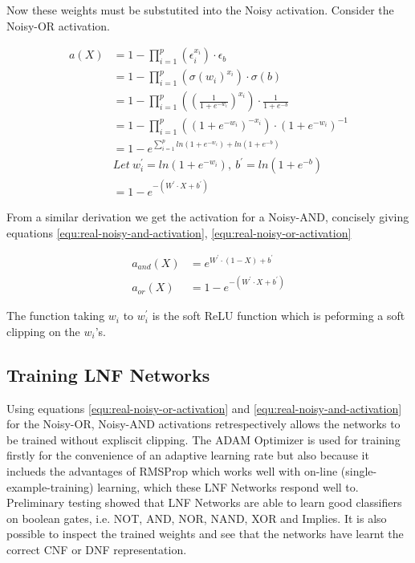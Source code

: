 Now these weights must be substutited into the Noisy activation. Consider the Noisy-OR activation.

\begin{align*}
a(X) &= 1 - \prod^p_{i=1}(\epsilon_i^{x_i}) \cdot \epsilon_b\\
&= 1 - \prod^p_{i=1}(\sigma(w_i)^{x_i}) \cdot \sigma(b)\\
&= 1 - \prod^p_{i=1}((\frac{1}{1 + e^{-w_i}})^{x_i}) \cdot \frac{1}{1 + e^{-b}}\\
&= 1 - \prod^p_{i=1}((1 + e^{-w_i})^{-x_i}) \cdot (1 + e^{-w_i})^{-1}\\
&= 1 - e^{\sum^p_{i=1} ln(1 + e^{-w_i}) + ln(1 + e^{-b})} \\
&Let\ w_i^{'} = ln(1 + e^{-w_i}),\ b^{'} = ln(1 + e^{-b})\\
&= 1 - e^{-(W^{'} \cdot X + b^{'})}
\end{align*}

From a similar derivation we get the activation for a Noisy-AND, concisely giving equations \ref{equ:real-noisy-and-activation}, \ref{equ:real-noisy-or-activation}

\begin{align}
a_{and}(X) &= e^{W^{'} \cdot (1 - X) + b^{'}} \label{equ:real-noisy-and-activation}\\
a_{or}(X)&= 1 - e^{-(W^{'} \cdot X + b^{'})} \label{equ:real-noisy-or-activation}
\end{align}

The function taking $w_i$ to $w_i^{'}$ is the soft ReLU function which is peforming a soft clipping on the $w_i$'s. 

\subsection{Training LNF Networks}
Using equations \ref{equ:real-noisy-or-activation} and \ref{equ:real-noisy-and-activation} for the Noisy-OR, Noisy-AND activations retrespectively allows the networks to be trained without expliscit clipping. The ADAM Optimizer is used for training firstly for the convenience of an adaptive learning rate but also because it inclueds the advantages of RMSProp which works well with on-line (single-example-training) learning, which these LNF Networks respond well to.\\

Preliminary testing showed that LNF Networks are able to learn good classifiers on boolean gates, i.e. NOT, AND, NOR, NAND, XOR and Implies. It is also possible to inspect the trained weights and see that the networks have learnt the correct CNF or DNF representation.

